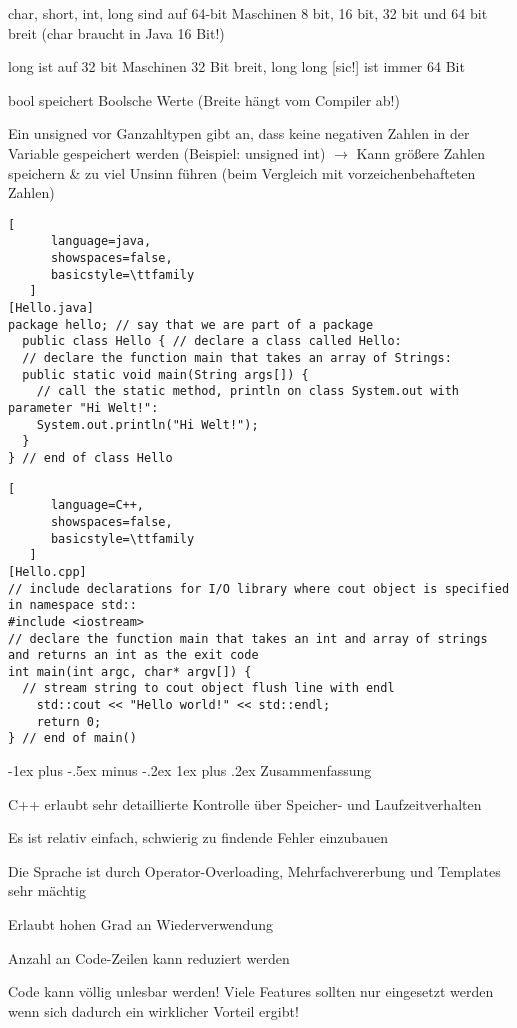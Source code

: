 \documentclass[10pt]{article}
\makeatletter
\renewcommand{\subsubsection}{\@startsection{subsubsection}{3}{0mm}%
                                {-1ex plus -.5ex minus -.2ex}%
                                {1ex plus .2ex}%
                                {\normalfont\small\bfseries}}
\makeatother
\begin{document}
\begin{itemize*}
\begin{itemize*}
\begin{itemize*}
    \item char, short, int, long sind auf 64-bit Maschinen 8 bit, 16 bit, 32 bit und 64 bit breit (char braucht in Java 16 Bit!)
    \item long ist auf 32 bit Maschinen 32 Bit breit, long long [sic!] ist immer 64 Bit
    \item bool speichert Boolsche Werte (Breite hängt vom Compiler ab!)
    \item Ein unsigned vor Ganzahltypen gibt an, dass keine negativen Zahlen in der Variable gespeichert werden (Beispiel: unsigned int) $\rightarrow$ Kann größere Zahlen speichern \& zu viel Unsinn führen (beim Vergleich mit vorzeichenbehafteten Zahlen)
  \end{itemize*}
\end{itemize*}

\begin{lstlisting}[
      language=java,
      showspaces=false,
      basicstyle=\ttfamily
   ]
[Hello.java] 
package hello; // say that we are part of a package
  public class Hello { // declare a class called Hello:
  // declare the function main that takes an array of Strings:
  public static void main(String args[]) {
    // call the static method, println on class System.out with parameter "Hi Welt!":
    System.out.println("Hi Welt!");
  }
} // end of class Hello
\end{lstlisting}

\begin{lstlisting}[
      language=C++,
      showspaces=false,
      basicstyle=\ttfamily
   ]
[Hello.cpp]
// include declarations for I/O library where cout object is specified in namespace std::
#include <iostream>
// declare the function main that takes an int and array of strings and returns an int as the exit code
int main(int argc, char* argv[]) {
  // stream string to cout object flush line with endl
    std::cout << "Hello world!" << std::endl;
    return 0;
} // end of main()
\end{lstlisting}

\subsubsection{Zusammenfassung}
\begin{itemize*}
  \item C++ erlaubt sehr detaillierte Kontrolle über Speicher- und Laufzeitverhalten
  \item Es ist relativ einfach, schwierig zu findende Fehler einzubauen
  \item Die Sprache ist durch Operator-Overloading, Mehrfachvererbung und Templates sehr mächtig
  \item Erlaubt hohen Grad an Wiederverwendung
  \item Anzahl an Code-Zeilen kann reduziert werden
  \item Code kann völlig unlesbar werden! Viele Features sollten nur eingesetzt werden wenn sich dadurch ein wirklicher Vorteil ergibt!
\end{itemize*}



\end{itemize*}
\end{document}
